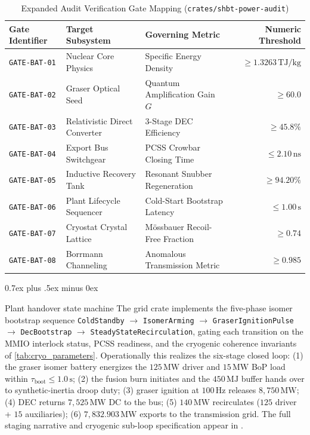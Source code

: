 \documentclass[11pt,journal,compsoc]{IEEEtran}
\makeatletter
\def\subsection{\@startsection{subsection}{2}{\z@}{-3.5ex plus -1.5ex minus -1.5ex}%
{0.7ex plus .5ex minus 0ex}{\normalfont\normalsize\sffamily\bfseries
\raggedright\hyphenpenalty=10000\exhyphenpenalty=10000\relax}}
\newcommand{\MW}{\,\mathrm{MW}}
\makeatother
\begin{document}
\begin{table}[htbp]
\centering
\small
\caption{Expanded Audit Verification Gate Mapping (\texttt{crates/shbt-power-audit})}
\label{tab:audit_crosswalk}
\begin{tabular}{lllr}
\hline
\textbf{Gate Identifier} & \textbf{Target Subsystem} & \textbf{Governing Metric} & \textbf{Numeric Threshold} \\
\hline
\texttt{GATE-BAT-01} & Nuclear Core Physics & Specific Energy Density & $\ge 1.3263\,\text{TJ/kg}$ \\
\texttt{GATE-BAT-02} & Graser Optical Seed & Quantum Amplification Gain $G$ & $\ge 60.0$ \\
\texttt{GATE-BAT-03} & Relativistic Direct Converter & 3-Stage DEC Efficiency & $\ge 45.8\%$ \\
\texttt{GATE-BAT-04} & Export Bus Switchgear & PCSS Crowbar Closing Time & $\le 2.10\,\text{ns}$ \\
\texttt{GATE-BAT-05} & Inductive Recovery Tank & Resonant Snubber Regeneration & $\ge 94.20\%$ \\
\texttt{GATE-BAT-06} & Plant Lifecycle Sequencer & Cold-Start Bootstrap Latency & $\le 1.00\,\text{s}$ \\
\texttt{GATE-BAT-07} & Cryostat Crystal Lattice & Mössbauer Recoil-Free Fraction & $\ge 0.74$ \\
\texttt{GATE-BAT-08} & Borrmann Channeling & Anomalous Transmission Metric & $\ge 0.985$ \\
\hline
\end{tabular}
\end{table}

\subsection{Plant handover state machine}
The grid crate implements the five-phase isomer bootstrap sequence
\texttt{ColdStandby} $\to$ \texttt{IsomerArming} $\to$
\texttt{GraserIgnitionPulse} $\to$ \texttt{DecBootstrap} $\to$
\texttt{SteadyStateRecirculation}, gating each transition on the MMIO
interlock status, PCSS readiness, and the cryogenic coherence invariants
of \autoref{tab:cryo_parameters}. Operationally this realizes the
six-stage closed loop: (1) the graser isomer battery energizes the
$125\MW$ driver and $15\MW$ BoP load within $\tau_{\mathrm{boot}} \le
1.0\,\mathrm{s}$; (2) the fusion burn initiates and the $450\,\mathrm{MJ}$
buffer hands over to synthetic-inertia droop duty; (3) graser ignition
at $100\,\mathrm{Hz}$ releases $8{,}750\MW$; (4) DEC returns
$7{,}525\MW$ DC to the bus; (5) $140\MW$ recirculates ($125$ driver +
$15$ auxiliaries); (6) $7{,}832.903\MW$ exports to the transmission
grid. The full staging narrative and cryogenic sub-loop specification
appear in \cite{supplementary}.
\end{document}
